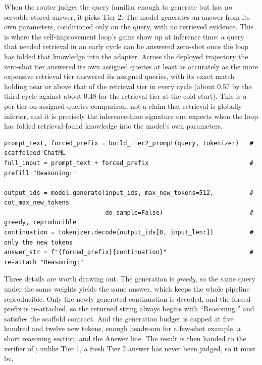 When the router judges the query familiar enough to generate but has no servable
stored answer, it picks Tier 2. The model generates an answer from its own parameters,
conditioned only on the query, with no retrieved evidence. This is where the
self-improvement loop's gains show up at inference time: a query that needed retrieval
in an early cycle can be answered zero-shot once the loop has folded that knowledge into
the adapter. Across the deployed trajectory the zero-shot tier answered its own assigned
queries at least as accurately as the more expensive retrieval tier answered its assigned
queries, with its exact match holding near or above that of the retrieval tier in every
cycle (about $0.57$ by the third cycle against about $0.48$ for the retrieval tier at the
cold start). This is a per-tier-on-assigned-queries comparison, not a claim that retrieval
is globally inferior, and it is precisely the inference-time signature one expects when the
loop has folded retrieval-found knowledge into the model's own parameters.

\begin{lstlisting}[caption={Tier 2 generation, condensed from \texttt{caem/pipeline.py}.}, label={lst:tier2}]
prompt_text, forced_prefix = build_tier2_prompt(query, tokenizer)   # scaffolded ChatML
full_input = prompt_text + forced_prefix                            # prefill "Reasoning:"

output_ids = model.generate(input_ids, max_new_tokens=512,          # cot_max_new_tokens
                            do_sample=False)                        # greedy, reproducible
continuation = tokenizer.decode(output_ids[0, input_len:])          # only the new tokens
answer_str = f"{forced_prefix}{continuation}"                       # re-attach "Reasoning:"
\end{lstlisting}

Three details are worth drawing out. The generation is \emph{greedy}, so the same query
under the same weights yields the same answer, which keeps the whole pipeline
reproducible. Only the newly generated continuation is decoded, and the forced prefix is
re-attached, so the returned string always begins with ``Reasoning:'' and satisfies the
scaffold contract. And the generation budget is capped at five hundred and twelve new
tokens, enough headroom for a few-shot example, a short reasoning section, and the Answer
line. The result is then handed to the verifier of ; unlike Tier 1, a
fresh Tier 2 answer has never been judged, so it must be.

